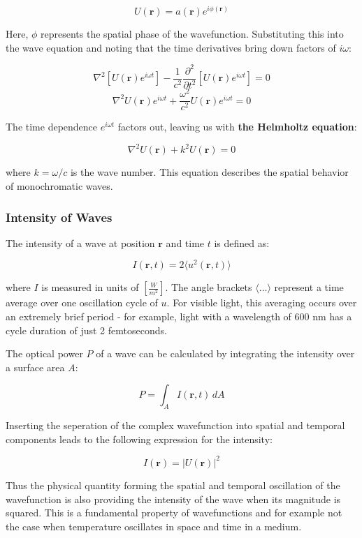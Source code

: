 \documentclass[
  a4paper,
]{book}
\begin{document}
\[
U(\mathbf{r})=a(\mathbf{r})e^{i\phi(\mathbf{r})}
\]

Here, \(\phi\) represents the spatial phase of the wavefunction.
Substituting this into the wave equation and noting that the time
derivatives bring down factors of \(i\omega\):

\[\nabla^2 [U(\mathbf{r})e^{i\omega t}] - \frac{1}{c^2}\frac{\partial^2}{\partial t^2}[U(\mathbf{r})e^{i\omega t}] = 0\]
\[\nabla^2 U(\mathbf{r})e^{i\omega t} + \frac{\omega^2}{c^2}U(\mathbf{r})e^{i\omega t} = 0\]

The time dependence \(e^{i\omega t}\) factors out, leaving us with
\textbf{the Helmholtz equation}:

\[\nabla^2 U(\mathbf{r}) + k^2U(\mathbf{r}) = 0\]

where \(k = \omega/c\) is the wave number. This equation describes the
spatial behavior of monochromatic waves.

\subsubsection{Intensity of Waves}\label{intensity-of-waves}

The intensity of a wave at position \(\mathbf{r}\) and time \(t\) is
defined as:

\[
I(\mathbf{r},t)=2\langle u^2(\mathbf{r},t)\rangle
\]

where \(I\) is measured in units of \(\left[\frac{W}{m^2}\right]\). The
angle brackets \(\langle \ldots \rangle\) represent a time average over
one oscillation cycle of \(u\). For visible light, this averaging occurs
over an extremely brief period - for example, light with a wavelength of
600 nm has a cycle duration of just 2 femtoseconds.

The optical power \(P\) of a wave can be calculated by integrating the
intensity over a surface area \(A\):

\[
P=\int_A I(\mathbf{r},t) \, dA
\]

Inserting the seperation of the complex wavefunction into spatial and
temporal components leads to the following expression for the intensity:

\[
I(\mathbf{r})=|U(\mathbf{r})|^2
\]

Thus the physical quantity forming the spatial and temporal oscillation
of the wavefunction is also providing the intensity of the wave when its
magnitude is squared. This is a fundamental property of wavefunctions
and for example not the case when temperature oscillates in space and
time in a medium.
\end{document}
